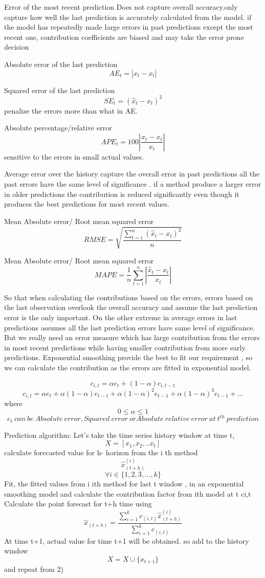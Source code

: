 Error of the most recent prediction
Does not capture overall accuracy.only capture how well the last prediction is accurately calculated from the model. if the model has repeatedly made large errors in past predictions except the most recent one, contribution coefficients are biased and may take the error prone decision

Absolute error of the last prediction
$$AE_t=|\hat{x}_t-x_t|$$

Squared error of the last prediction
$$SE_t=(\hat{x}_t-x_t)^2$$
penalize the errors more than what in AE.

Absolute percentage/relative error
$$APE_t=100\left |\frac{\hat{x}_t-x_t}{x_t}  \right |$$
sensitive to the errors in small actual values. 
		
Average error over the history
capture the overall error in past predictions all the past errors have the same level of significance . if a method produce a larger error in older predictions  the contribution is reduced significantly even though it produces the best predictions for most recent values.

Mean Absolute error/ Root mean squared error
$$RMSE=\sqrt{\frac{\sum_{t=1}^{n}(\hat{x}_{t}-x_{t})^{2}}{n}}$$ 

Mean Absolute error/ Root mean squared error
$$ MAPE=\frac{1}{n}\sum_{t=1}^{n}\left | \frac{\hat{x}_{t}-x_{t}}{x_{t}} \right |$$

So that when calculating the contributions based on the errors, errors based on the last observation overlook the overall accuracy and assume the last prediction error is the only important. On the other extreme in average errors in last predictions assumes all the last prediction errors have same level of significance. But we really need an error measure which has large contribution from the errors in most recent predictions while having smaller contribution from more early predictions. Exponential smoothing provide the best to fit our requirement , so we can calculate the contribution as the errors are fitted in exponential model.

$$c_{i,t}= \alpha e_t + (1-\alpha)c_{i,t-1}$$
$$c_{i,t}=\alpha e_t + \alpha(1-\alpha)e_{t-1}+\alpha(1-\alpha)^2e_{t-1}+\alpha(1-\alpha)^3e_{t-1}+ . ..$$
where $$0\leq \alpha \leq 1$$	$$ e_{t} \ can \ be \ Absolute \ error , Squared \ error \ or Absolute \ relative \ error \ at \ t^{th} \ prediction $$

Prediction algorithm:
 Let's take the  time series history window at time t, $$X=[x_{1},x_{2},.. x_{t}]$$ 
calculate forecasted value for  h- horizon from the i th method $$\hat{x}_{(t+h)}^{(i)}$$ $$\forall i \in \{1,2,3,...,k\}$$ 
Fit, the fitted values from i ith method for last t window ,  in an exponential smoothing model and calculate the contribution factor from ith model at t ci,t
Calculate the point forecast for t+h time using 
$$\hat{x}_{(t+h)}= \frac{\sum_{i=1}^{k}c_{(i,t)} \hat{x}_{(t+h)}^{(i)}}{\sum_{i=1}^{k}c_{(i,t)}}$$
At time t+1,  actual value for time t+1  will be obtained. so add  to the history window $$X=X\cup \{x_{t+1}\}$$ and repeat from 2)
